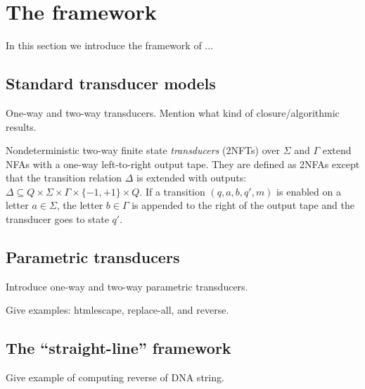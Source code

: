 \section{The framework}
\label{sec:framework}

In this section we introduce the framework of ...

\subsection{Standard transducer models}

One-way and two-way transducers. Mention what kind of closure/algorithmic
results.


\begin{definition}
  Nondeterministic two-way finite state \emph{transducers} (2NFTs) over $\Sigma$ and $\Gamma$ extend NFAs with a one-way left-to-right output tape. They are defined as 2NFAs except that the transition relation $\Delta$ is extended with outputs: $\Delta\subseteq Q \times \Sigma \times \Gamma \times \{-1, +1\} \times  Q $. If a transition $(q, a, b, q′, m)$ is enabled on a letter $a\in \Sigma$, the letter $b\in \Gamma$ is appended to the right of
	the output tape and the transducer goes to state $q'$.
\end{definition}

\subsection{Parametric transducers}

Introduce one-way and two-way parametric transducers. 

Give examples: htmlescape, replace-all, and reverse.

\subsection{The ``straight-line'' framework}

Give example of computing reverse of DNA string.
